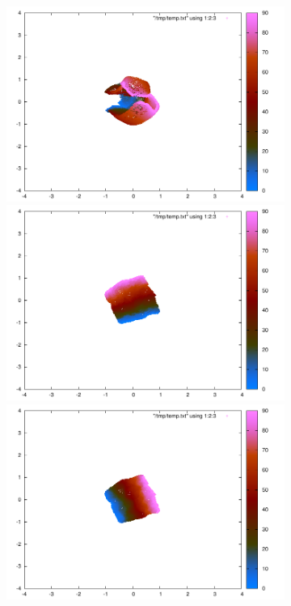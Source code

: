 \documentclass{article} %
\begin{document}
\begin{figure}
\begin{subfigure}[b]{0.49 \textwidth}
\includegraphics[scale=0.5,trim = 120 100 130 70, clip]{./Figures/drlim2.pdf}\\
\includegraphics[scale=0.5,trim = 120 100 130 70, clip]{./Figures/drlim3.pdf} 
\includegraphics[scale=0.5,trim = 120 100 130 70, clip]{./Figures/drlim4.pdf}
        \caption{}
        \label{fig:drlim} 
\end{subfigure}


\end{figure}
\end{document}
